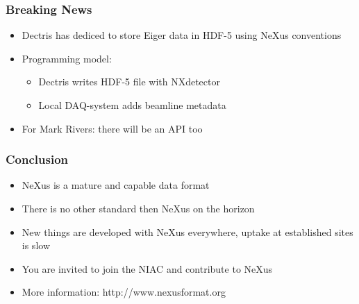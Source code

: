 \documentclass{beamer}
\begin{document}
\begin{frame} \frametitle{Breaking News}
\begin{itemize}
\item<1-> Dectris has dediced to store Eiger data in HDF-5 using NeXus conventions
\item<1-> Programming model:
\begin{itemize}
\item<1-> Dectris writes HDF-5 file with NXdetector
\item<1-> Local DAQ-system adds beamline metadata   
\end{itemize}
\item<2-> For Mark Rivers: there will be an API too
\end{itemize}
\end{frame}


\begin{frame} \frametitle{Conclusion }
\begin{itemize}
\item NeXus is a mature and capable data format
\item There is no other standard then NeXus on the horizon
\item New things are developed with NeXus everywhere, uptake at established sites is slow
\item You are invited to join the NIAC and contribute to NeXus 
\item More information: http://www.nexusformat.org
\end{itemize}
\end{frame}
\end{document}
